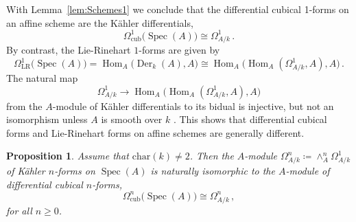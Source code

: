 \documentclass[12pt,reqno, a4paper]{amsart}
\numberwithin{equation}{section}
\theoremstyle{plain}
\newtheorem{Proposition}[Theorem]{Proposition}
\theoremstyle{definition}
\theoremstyle{remark}
\DeclareMathOperator{\Der}{Der}
\DeclareMathOperator{\Hom}{Hom}
\DeclareMathOperator{\Spec}{Spec}
\begin{document}
With Lemma~\ref{lem:Schemes1} we conclude that the differential cubical 1-forms on an affine scheme are the K\"ahler differentials,
\begin{equation*}
  \Omega^1_\mathrm{cub}\bigl( \Spec(A) \bigr)
  \cong
  \Omega^1_{A/k}
  \,.
\end{equation*}
By contrast, the Lie-Rinehart $1$-forms are given by
\begin{equation*}
  \Omega^1_\mathrm{LR}\bigl( \Spec(A) \bigr)
  =
  \Hom_A\bigl( \Der_k(A), A \bigr)
  \cong
  \Hom_A\bigl( \Hom_A(\Omega^1_{A/k}, A), A \bigr)
  \,.
\end{equation*}
The natural map
\begin{equation}
  \Omega^1_{A/k} \longrightarrow
  \Hom_A\bigl( \Hom_A(\Omega^1_{A/k}, A), A \bigr)
\end{equation}
from the $A$-module of K\"ahler differentials to its bidual is injective, but not an isomorphism unless $A$ is smooth over $k$ \cite[\S 7.7]{AintablianBlohmann:2026}. This shows that differential cubical forms and Lie-Rinehart forms on affine schemes are generally different.

\begin{Proposition}
\label{prop:SchemeCubKaehler}
Assume that $\mathrm{char}(k) \neq 2$. Then the $A$-module $\Omega^n_{A/k} \coloneqq \wedge^n_A \Omega^1_{A/k}$ of K\"ahler $n$-forms on $\Spec(A)$ is naturally isomorphic to the $A$-module of differential cubical $n$-forms,
\begin{equation*}
  \Omega_\mathrm{cub}^n \bigl( \Spec(A) \bigr)
  \cong
  \Omega^n_{A/k}
  \,,
\end{equation*}
for all $n \geq 0$.
\end{Proposition}
\end{document}
